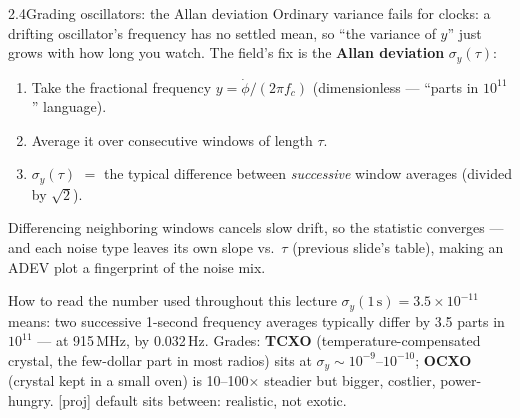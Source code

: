 \documentclass[10pt]{beamer}
\newcommand{\proj}[1]{\textcolor{green!35!black}{[proj#1]}}
\newcommand{\srcline}[1]{\par\vfill\noindent{\tiny\textcolor{gray}{Source: #1}}}
\begin{document}
\begin{frame}{2.4\quad Grading oscillators: the Allan deviation}
\small
Ordinary variance fails for clocks: a drifting oscillator's frequency
has no settled mean, so ``the variance of $y$'' just grows with how
long you watch. The field's fix is the \textbf{Allan deviation}
$\sigma_y(\tau)$:
\begin{enumerate}
\item Take the fractional frequency $y=\dot\phi/(2\pi f_c)$
(dimensionless --- ``parts in $10^{11}$'' language).
\item Average it over consecutive windows of length $\tau$.
\item $\sigma_y(\tau)$ $=$ the typical difference between
\emph{successive} window averages (divided by $\sqrt2$).
\end{enumerate}
Differencing neighboring windows cancels slow drift, so the statistic
converges --- and each noise type leaves its own slope vs.\ $\tau$
(previous slide's table), making an ADEV plot a fingerprint of the
noise mix.
\begin{block}{How to read the number used throughout this lecture}
$\sigma_y(1\,\mathrm s)=3.5\times10^{-11}$ means: two successive
1-second frequency averages typically differ by 3.5 parts in $10^{11}$
--- at 915\,MHz, by 0.032\,Hz. Grades: \textbf{TCXO}
(temperature-compensated crystal, the few-dollar part in most radios)
sits at $\sigma_y\sim10^{-9}$--$10^{-10}$; \textbf{OCXO} (crystal kept
in a small oven) is 10--100$\times$ steadier but bigger, costlier,
power-hungry. \proj{} default sits between: realistic, not exotic.
\end{block}
\srcline{ADEV: IEEE Std 1139.}
\end{frame}
\end{document}
